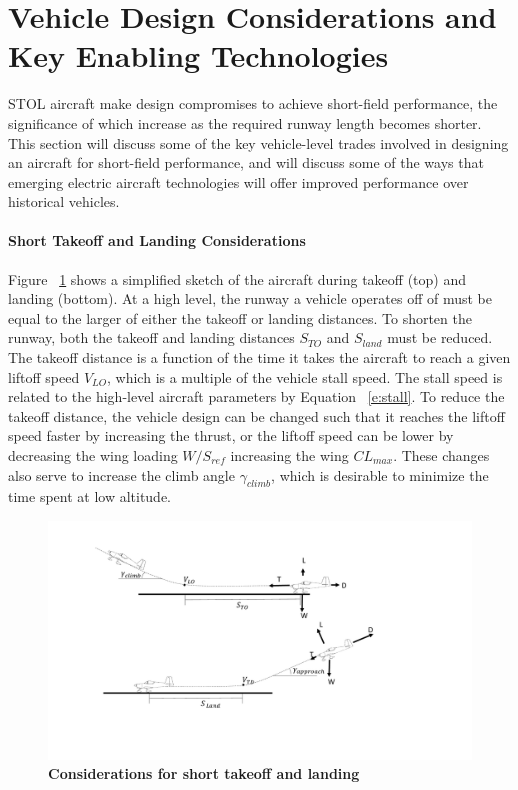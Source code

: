 \documentclass[]{aiaa-tc}%
\begin{document}
\section{Vehicle Design Considerations and Key Enabling Technologies}
STOL aircraft make design compromises to achieve short-field performance, the significance of which increase as the required runway length becomes shorter.  This section will discuss some of the key vehicle-level trades involved in designing an aircraft for short-field performance, and will discuss some of the ways that emerging electric aircraft technologies will offer improved performance over historical vehicles. 


\paragraph{Short Takeoff and Landing Considerations}
Figure ~\ref{f:takeoff} shows a simplified sketch of the aircraft during takeoff (top) and landing (bottom).  At a high level, the runway a vehicle operates off of must be equal to the larger of either the takeoff or landing distances.  To shorten the runway, both the takeoff and landing distances $S_{TO}$ and $S_{land}$ must be reduced.  The takeoff distance is a function of the time it takes the aircraft to reach a given liftoff speed $V_{LO}$, which is a multiple of the vehicle stall speed.  The stall speed is related to the high-level aircraft parameters by Equation ~\ref{e:stall}.  To reduce the takeoff distance, the vehicle design can be changed such that it reaches the liftoff speed faster by increasing the thrust, or the liftoff speed can be lower by decreasing the wing loading $W/S_{ref}$ increasing the wing $CL_{max}$.  These changes also serve to increase the climb angle $\gamma_{climb}$, which is desirable to minimize the time spent at low altitude. 
\begin{figure}[h!]
	\begin{center}
	\includegraphics[width=1.0\textwidth]{takeoff_fig.pdf}
    \caption{\textbf{Considerations for short takeoff and landing}}
	\label{f:takeoff}
	\end{center}
\end{figure}
\end{document}
